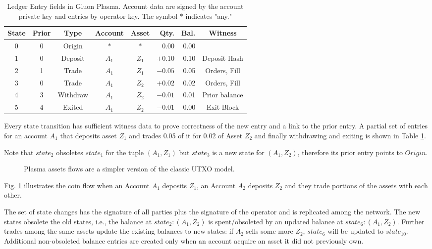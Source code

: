\documentclass[12pt,a4paper]{article}
\begin{document}
\begin{table}[ht]
\caption{Ledger Entry fields in Gluon Plasma. Account data are signed by the account private key and entries by operator key. The symbol $*$ indicates "any."}
\centering
\begin{tabular}{|c|c|c|c|c|r|r|c|}
\hline

\bfseries State &\bfseries  Prior &\bfseries  Type &\bfseries  Account &\bfseries  Asset &\bfseries  Qty. &\bfseries  Bal. &\bfseries  Witness  \\
\hline
0 & 0 & Origin & $*$ & $*$ & 0.00 & 0.00 &  \\
1 & 0 & Deposit & $A_1$ & $Z_1$ & $+0.10$ & 0.10 & Deposit Hash  \\
2 & 1 & Trade & $A_1$ & $Z_1$ & $-0.05$ & 0.05 & Orders, Fill \\
3 & 0 & Trade & $A_1$ & $Z_2$ & $+0.02$ & 0.02 & Orders, Fill \\
4 & 3 & Withdraw & $A_1$ & $Z_2$ & $-0.01$ & 0.01 & Prior balance \\
5 & 4 & Exited & $A_1$ & $Z_2$ & $-0.01$ & 0.00 & Exit Block \\
\hline
\end{tabular}
\label{sampleEntries}
\end{table}

Every state transition has sufficient witness data to prove correctness of the new entry and a link to the prior entry. A partial set of entries for an account $A_1$ that deposits asset $Z_1$ and trades 0.05 of it for 0.02 of Asset $Z_2$ and finally withdrawing and exiting is shown in Table \ref{sampleEntries}.

Note that $state_{2}$ obsoletes $state_1$ for the tuple \((A_1, Z_1)\) but $state_3$ is a new state for \((A_1, Z_2)\), therefore its prior entry points to $Origin$.

\begin{figure}[ht]
\begin{center}

\end{center}
\caption{Plasma assets flows are a simpler version of the classic UTXO model. }
\label{plasmautxomodel}
\end{figure}

Fig. \ref{plasmautxomodel} illustrates the coin flow when an Account $A_1$ deposits $Z_1$, an Account $A_2$ deposits $Z_2$ and they trade portions of the assets with each other.

The set of state changes has the signature of all parties plus the signature of the operator and is replicated among the network. The new states obsolete the old states, i.e., the balance at \(state_2: (A_1, Z_2) \) is spent/obsoleted by an updated balance at \(state_6: (A_1, Z_2)\). Further trades among the same assets update the existing balances to new states: if $A_2$ sells some more $Z_2$, $state_6$ will be updated to $state_{10}$. Additional non-obsoleted balance entries are created only when an account acquire an asset it did not previously own.
\end{document}
